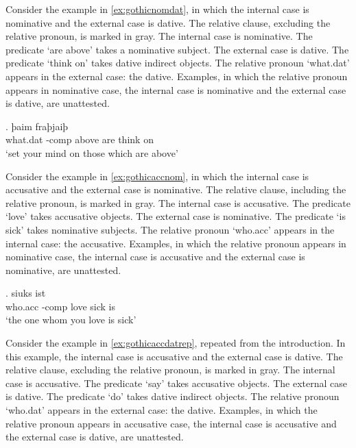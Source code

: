 Consider the example in \ref{ex:gothicnomdat}, in which the internal case is nominative and the external case is dative.
The relative clause, excluding the relative pronoun, is marked in gray.
The internal case is nominative. The predicate  `are above' takes a nominative subject.
The external case is dative. The predicate  `think on' takes dative indirect objects.
The relative pronoun  `what.\ac{dat}' appears in the external case: the dative.
Examples, in which the relative pronoun appears in nominative case, the internal case is nominative and the external case is dative, are unattested.

\exg. þaim    fraþjaiþ \\
 what.\ac{dat} -\ac{comp} above are\scsub{[nom]} {think on}\scsub{[dat]}\\
 `set your mind on those which are above' \label{ex:gothicnomdat}

Consider the example in \ref{ex:gothicaccnom}, in which the internal case is accusative and the external case is nominative.
The relative clause, including the relative pronoun, is marked in gray.
The internal case is accusative. The predicate  `love' takes accusative objects.
The external case is nominative. The predicate  `is sick' takes nominative subjects.
The relative pronoun  `who.\ac{acc}' appears in the internal case: the accusative.
Examples, in which the relative pronoun appears in nominative case, the internal case is accusative and the external case is nominative, are unattested.

\exg.    siuks ist\\
 who.\ac{acc} -\ac{comp} love\scsub{[acc]} sick is\scsub{[nom]}\\
 `the one whom you love is sick' \label{ex:gothicaccnom}

Consider the example in \ref{ex:gothicaccdatrep}, repeated from the introduction. In this example, the internal case is accusative and the external case is dative.
The relative clause, excluding the relative pronoun, is marked in gray.
The internal case is accusative. The predicate  `say' takes accusative objects.
The external case is dative. The predicate  `do' takes dative indirect objects.
The relative pronoun  `who.\ac{dat}' appears in the external case: the dative.
Examples, in which the relative pronoun appears in accusative case, the internal case is accusative and the external case is dative, are unattested.

